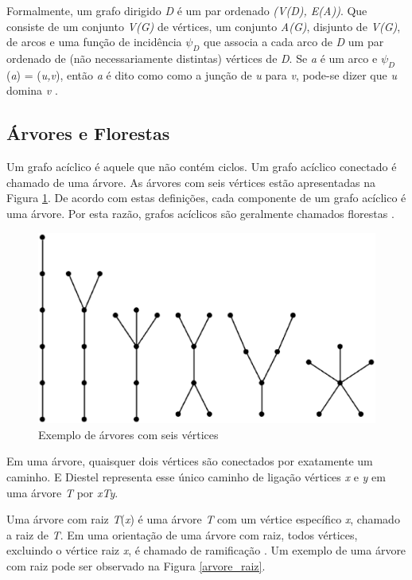Formalmente, um grafo dirigido \textit{D} é um par ordenado \textit{(V(D), E(A))}. Que consiste de um conjunto \textit{V(G)} de vértices, um conjunto \textit{A(G)}, disjunto de \textit{V(G)}, de arcos e uma função de incidência $\psi_D$ que associa a cada arco de \textit{D} um par ordenado de (não necessariamente distintas) vértices de \textit{D}. Se \textit{a} é um arco e $\psi_D$(\textit{a}) = (\textit{u,v}), então \textit{a} é dito como como a junção de \textit{u} para \textit{v}, pode-se dizer que \textit{u} domina \textit{v} \cite{Diestel:1997}.

\subsection{Árvores e Florestas}

Um grafo acíclico é aquele que não contém ciclos. Um grafo acíclico conectado é chamado de uma árvore. As árvores com seis vértices estão apresentadas na Figura \ref{arvores_seis_vertices}. De acordo com estas definições, cada componente de um grafo acíclico é uma árvore. Por esta razão, grafos acíclicos são geralmente chamados florestas \cite{Bondy:2007}.

\begin{figure}[!h]
	\centering
	\includegraphics[scale=0.2]{figuras/capitulo2/arvores_seis_vertices.eps}
	\caption{Exemplo de árvores com seis vértices}
	\label{arvores_seis_vertices}
\end{figure}

Em uma árvore, quaisquer dois vértices são conectados por exatamente um caminho. E Diestel \cite{Diestel:1997} representa esse único caminho de ligação vértices \textit{x} e \textit{y} em uma árvore \textit{T} por \textit{xTy}.

Uma árvore com raiz \textit{T}(\textit{x}) é uma árvore \textit{T} com um vértice específico \textit{x}, chamado a raiz de \textit{T}. Em uma orientação de uma árvore com raiz, todos vértices, excluindo o vértice raiz \textit{x}, é chamado de ramificação \cite{Bondy:2007}. Um exemplo de uma árvore com raiz pode ser observado na Figura \ref{arvore_raiz}.

